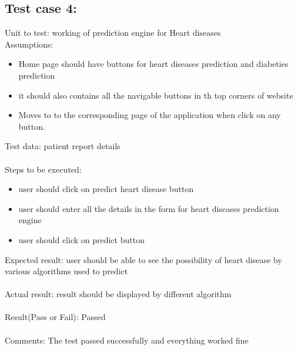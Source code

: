 \documentclass[oneside,12pt]{Classes/VTU}
\begin{document}
	\subsection{Test case 4:}
	Unit to test: working of prediction engine for Heart diseases \\
	Assumptions:
	\begin{itemize}
		\item Home page should have buttons for heart diseases prediction and diabeties prediction
		\item it should also contains all the navigable buttons in th top corners of website
		\item Moves to to the corresponding page of the application when click on any button.
	\end{itemize}
	Test data: patient report details\\
	\\
	Steps to be executed:
	\begin{itemize}
		\item user should click on predict heart disease button
		\item user should enter all the details in the form for heart diseases prediction engine
		\item user should click on predict button
	\end{itemize}
	Expected result:  user should be able to see the possibility of heart disease by various algorithms used to predict\\
	\\
	Actual result: result should be displayed by different algorithm\\
	\\
	Result(Pass or Fail): Passed\\
	\\
	Comments: The test passed successfully and everything worked fine
	
\end{document}
